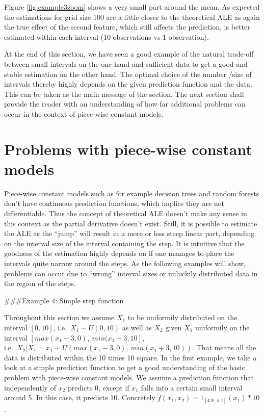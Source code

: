 \documentclass[
]{krantz}
\begin{document}
Figure \ref{fig:example3zoom} shows a very small part around the mean.
As expected the estimations for grid size 100 are a little closer to the theoretical ALE as again the true effect of the second feature, which still affects the prediction, is better estimated within each interval (10 observations vs 1 observation).

At the end of this section, we have seen a good example of the natural trade-off between small intervals on the one hand and sufficient data to get a good and stable estimation on the other hand. The optimal choice of the number /size of intervals thereby highly depends on the given prediction function and the data. This can be taken as the main message of the section. The next section shall provide the reader with an understanding of how far additional problems can occur in the context of piece-wise constant models.

\hypertarget{problems-with-piece-wise-constant-models}{%
\section{Problems with piece-wise constant models}\label{problems-with-piece-wise-constant-models}}

Piece-wise constant models such as for example decision trees and random forests don't have continuous prediction functions, which implies they are not differentiable. Thus the concept of theoretical ALE doesn't make any sense in this context as the partial derivative doesn't exist. Still, it is possible to estimate the ALE as the ``jump'' will result in a more or less steep linear part, depending on the interval size of the interval containing the step. It is intuitive that the goodness of the estimation highly depends on if one manages to place the intervals quite narrow around the steps.
As the following examples will show, problems can occur due to ``wrong'' interval sizes or unluckily distributed data in the region of the steps.

\#\#\#Example 4: Simple step function

Throughout this section we assume \(X_1\) to be uniformily distributed on the interval \([0,10]\), i.e.~\(X_1 \sim U(0,10)\) as well as \(X_2\) given \(X_1\) uniformily on the interval \([max(x_1 - 3, 0),~min( x_1 + 3, 10]\),\\
i.e.~\(X_2 \vert X_1 = x_1 \sim U(max(x_1 - 3, 0),~min( x_1 + 3, 10) )\). That means all the data is distributed within the 10 times 10 square.
In the first example, we take a look at a simple prediction function to get a good understanding of the basic problem with piece-wise constant models. We assume a prediction function that independently of \(x_2\) predicts 0, except if \(x_1\) falls into a certain small interval around 5. In this case, it predicts 10. Concretely \(f(x_1, x_2) = 1_{[4.9,~5.1]}(x_1) * 10\).
\end{document}

